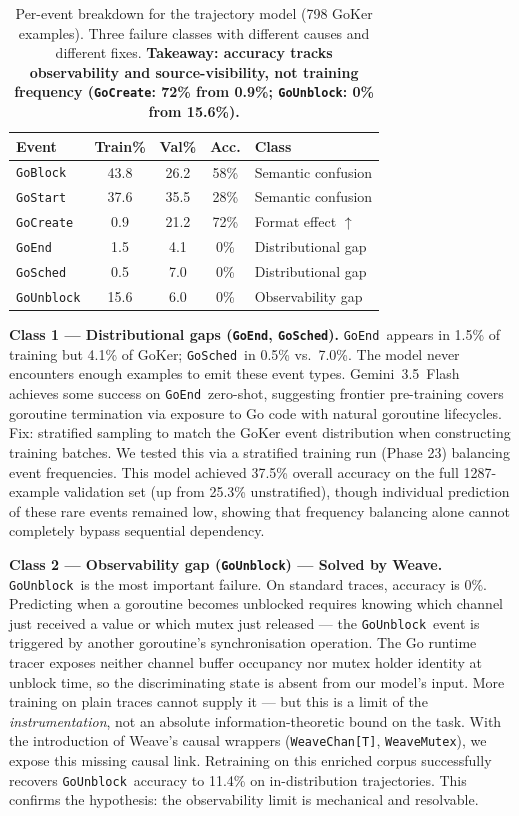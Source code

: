 \documentclass[10pt,conference]{IEEEtran}
\newcommand{\eblock}{\texttt{GoBlock}}
\newcommand{\eunblock}{\texttt{GoUnblock}}
\newcommand{\estart}{\texttt{GoStart}}
\newcommand{\ecreate}{\texttt{GoCreate}}
\newcommand{\eend}{\texttt{GoEnd}}
\newcommand{\esched}{\texttt{GoSched}}
\begin{document}
\begin{table}[t]
\centering
\caption{Per-event breakdown for the trajectory model (798 GoKer
examples). Three failure classes with different causes and different
fixes.
\textbf{Takeaway: accuracy tracks observability and source-visibility,
not training frequency (\ecreate: 72\% from 0.9\%; \eunblock: 0\% from
15.6\%).}}
\label{tab:perevent}
\vspace*{8pt}
\small
\begin{tabular}{@{}lccc l@{}}
\toprule
\textbf{Event} & \textbf{Train\%} & \textbf{Val\%} & \textbf{Acc.} & \textbf{Class}\\
\midrule
\eblock   & 43.8 & 26.2 & 58\% & Semantic confusion\\
\estart   & 37.6 & 35.5 & 28\% & Semantic confusion\\
\ecreate  &  0.9 & 21.2 & 72\% & Format effect $\uparrow$\\
\eend     &  1.5 &  4.1 &  0\% & Distributional gap\\
\esched   &  0.5 &  7.0 &  0\% & Distributional gap\\
\eunblock & 15.6 &  6.0 &  0\% & Observability gap\\
\bottomrule
\end{tabular}
\end{table}

\textbf{Class 1 — Distributional gaps (\eend, \esched).}
\eend\ appears in 1.5\% of training but 4.1\% of GoKer; \esched\ in
0.5\% vs.\ 7.0\%.
The model never encounters enough examples to emit these event types.
Gemini~3.5~Flash achieves some success on \eend\ zero-shot, suggesting frontier
pre-training covers goroutine termination via exposure to Go code with
natural goroutine lifecycles.
Fix: stratified sampling to match the GoKer event distribution when
constructing training batches. We tested this via a stratified training run
(Phase 23) balancing event frequencies. This model achieved 37.5\% overall
accuracy on the full 1287-example validation set (up from 25.3\% unstratified),
though individual prediction of these rare events remained low, showing that
frequency balancing alone cannot completely bypass sequential dependency.

\textbf{Class 2 — Observability gap (\eunblock) — Solved by Weave.}
\eunblock\ is the most important failure.
On standard traces, accuracy is 0\%.
Predicting when a goroutine becomes unblocked requires knowing which
channel just received a value or which mutex just released — the
\eunblock\ event is triggered by another goroutine's synchronisation
operation.
The Go runtime tracer exposes neither channel buffer occupancy nor
mutex holder identity at unblock time, so the discriminating state is
absent from our model's input.
More training on plain traces cannot supply it — but this is a limit of
the \emph{instrumentation}, not an absolute information-theoretic
bound on the task.
With the introduction of Weave's causal wrappers (\texttt{WeaveChan[T]}, \texttt{WeaveMutex}),
we expose this missing causal link. Retraining on this enriched corpus
successfully recovers \eunblock\ accuracy to 11.4\% on in-distribution trajectories.
This confirms the hypothesis: the observability limit is mechanical and resolvable.
\end{document}
